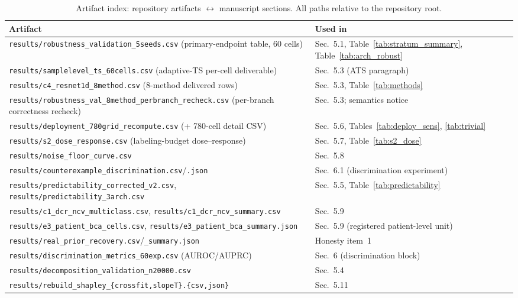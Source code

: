 \documentclass[final,5p,times,nonatbib]{elsarticle}
\begin{document}
\begin{table}[tb]
\centering
\caption{Artifact index: repository artifacts $\leftrightarrow$
manuscript sections. All paths relative to the repository root.}
\label{tab:artifact-index}
\footnotesize
\begin{tabular}{p{}p{}}
\toprule
Artifact & Used in \\
\midrule
\texttt{results/robustness\_validation\_5seeds.csv} (primary-endpoint table, 60 cells) & Sec.~5.1, Table~\ref{tab:stratum_summary}, Table~\ref{tab:arch_robust} \\
\texttt{results/samplelevel\_ts\_60cells.csv} (adaptive-TS per-cell deliverable) & Sec.~5.3 (ATS paragraph) \\
\texttt{results/c4\_resnet1d\_8method.csv} (8-method delivered rows) & Sec.~5.3, Table~\ref{tab:methods} \\
\texttt{results/robustness\_val\_8method\_perbranch\_recheck.csv} (per-branch correctness recheck) & Sec.~5.3; semantics notice \\
\texttt{results/deployment\_780grid\_recompute.csv} (+ 780-cell detail CSV) & Sec.~5.6, Tables~\ref{tab:deploy_sens}, \ref{tab:trivial} \\
\texttt{results/s2\_dose\_response.csv} (labeling-budget dose--response) & Sec.~5.7, Table~\ref{tab:s2_dose} \\
\texttt{results/noise\_floor\_curve.csv} & Sec.~5.8 \\
\texttt{results/counterexample\_discrimination.csv}/\texttt{.json} & Sec.~6.1 (discrimination experiment) \\
\texttt{results/predictability\_corrected\_v2.csv}, \texttt{results/predictability\_3arch.csv} & Sec.~5.5, Table~\ref{tab:predictability} \\
\texttt{results/c1\_dcr\_ncv\_multiclass.csv}, \texttt{results/c1\_dcr\_ncv\_summary.csv} & Sec.~5.9 \\
\texttt{results/e3\_patient\_bca\_cells.csv}, \texttt{results/e3\_patient\_bca\_summary.json} & Sec.~5.9 (registered patient-level unit) \\
\texttt{results/real\_prior\_recovery.csv}/\texttt{\_summary.json} & Honesty item~1 \\
\texttt{results/discrimination\_metrics\_60exp.csv} (AUROC/AUPRC) & Sec.~6 (discrimination block) \\
\texttt{results/decomposition\_validation\_n20000.csv} & Sec.~5.4 \\
\texttt{results/rebuild\_shapley\_\{crossfit,slopeT\}.\{csv,json\}} & Sec.~5.11 \\

\end{tabular}
\end{table}
\end{document}
